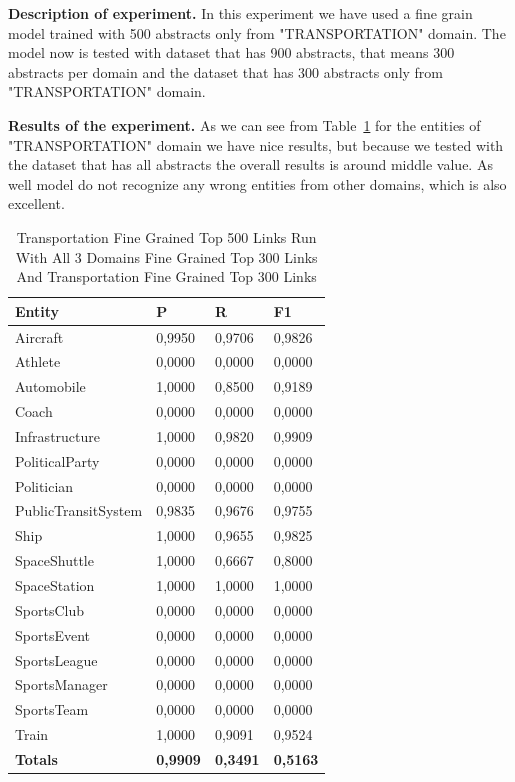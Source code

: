 \documentclass[thesis=M,english]{FITthesis}[2018/05/30]
\begin{document}
\textbf{Description of experiment.} In this experiment we have used a fine grain model trained with 500 abstracts only from "TRANSPORTATION" domain. The model now is tested with dataset that has 900 abstracts, that means 300 abstracts per domain and the dataset that has 300 abstracts only from "TRANSPORTATION" domain.

\textbf{Results of the experiment.} As we can see from Table~\ref{table:Transportation500With2Datasets} for the entities of "TRANSPORTATION" domain we have nice results, but because we tested with the dataset that has all abstracts the overall results is around middle value. As well model do not recognize any wrong entities from other domains, which is also excellent.

	\begin{table}[H]\centering
		\begin{tabular}{|l|l|l|l|}
			\hline {\textbf{Entity}} & {\textbf{P}} & {\textbf{R}} & {\textbf{F1}}\\\hline
				Aircraft & 0,9950 & 0,9706 & 0,9826\\
				Athlete & 0,0000 & 0,0000 & 0,0000\\
				Automobile & 1,0000 & 0,8500 & 0,9189\\ 
				Coach & 0,0000 & 0,0000 & 0,0000\\
				Infrastructure & 1,0000 & 0,9820 & 0,9909\\
				PoliticalParty & 0,0000 & 0,0000 & 0,0000\\
				Politician & 0,0000 & 0,0000 & 0,0000\\
				PublicTransitSystem & 0,9835 & 0,9676 & 0,9755\\
				Ship & 1,0000 & 0,9655 & 0,9825\\
				SpaceShuttle & 1,0000 & 0,6667 & 0,8000\\
				SpaceStation & 1,0000 & 1,0000 & 1,0000\\ 
				SportsClub & 0,0000 & 0,0000 & 0,0000\\
				SportsEvent & 0,0000 & 0,0000 & 0,0000\\
				SportsLeague & 0,0000 & 0,0000 & 0,0000\\
				SportsManager & 0,0000 & 0,0000 & 0,0000\\
				SportsTeam & 0,0000 & 0,0000 & 0,0000\\
				Train & 1,0000 & 0,9091 & 0,9524\\\hline
				\textbf{Totals} & \textbf{0,9909} & \textbf{0,3491} & \textbf{0,5163}\\\hline
		\end{tabular}
		\caption{Transportation Fine Grained Top 500 Links Run With All 3 Domains Fine Grained Top 300 Links And Transportation Fine Grained Top 300 Links \label{table:Transportation500With2Datasets}}
	\end{table}
	
\end{document}
